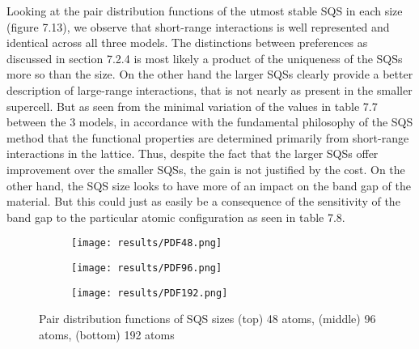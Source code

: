Looking at the pair distribution functions of the utmost stable SQS in each size (figure 7.13), we observe that short-range interactions is well represented and identical across all three models. The distinctions between preferences as discussed in section 7.2.4 is most likely a product of the uniqueness of the SQSs more so than the size. On the other hand the larger SQSs clearly provide a better description of large-range interactions, that is not nearly as present in the smaller supercell. But as seen from the minimal variation of the values in table 7.7 between the 3 models, in accordance with the fundamental philosophy of the SQS method that the functional properties are determined primarily from short-range interactions in the lattice. Thus, despite the fact that the larger SQSs offer improvement over the smaller SQSs, the gain is not justified by the cost. On the other hand, the SQS size looks to have more of an impact on the band gap of the material. But this could just as easily be a consequence of the sensitivity of the band gap to the particular atomic configuration as seen in table 7.8.

\begin{figure}[H]
\begin{subfigure}{\textwidth}
\texttt{[image: results/PDF48.png]}
\end{subfigure}
\begin{subfigure}{\textwidth}
\texttt{[image: results/PDF96.png]}
\end{subfigure}
\begin{subfigure}{\textwidth}
\texttt{[image: results/PDF192.png]}
\end{subfigure}
\caption{Pair distribution functions of SQS sizes (top) 48 atoms, (middle) 96 atoms, (bottom) 192 atoms}
\end{figure}
